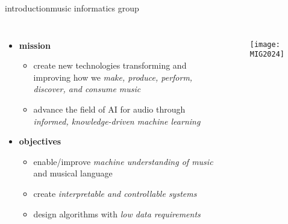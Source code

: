 \begin{frame}{introduction}{music informatics group}
    \vspace{-5mm}
    \begin{columns}
    \begin{itemize}
        \item   \textbf{mission}
            \begin{itemize}
                \item   create new technologies transforming and improving how we \textit{make, produce, perform, discover, and consume music}
                \item   advance the field of AI for audio through \textit{informed, knowledge-driven machine learning}
            \end{itemize}
        \bigskip
        \item   \textbf{objectives}
            \begin{itemize}
                \item   enable/improve \textit{machine understanding of music} and musical language
                \item   create \textit{interpretable and controllable systems}
                \item   design algorithms with \textit{low data requirements}
            \end{itemize}
    \end{itemize}
        \vspace{12mm}\begin{figure}%
            \texttt{[image: MIG2024]}%
        \end{figure}
    \end{columns}
\end{frame}

